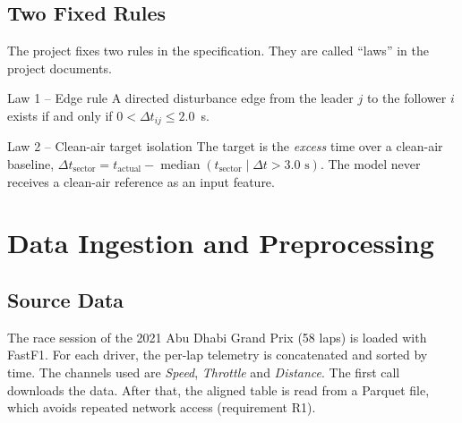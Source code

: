 \documentclass[11pt,a4paper]{article}
\newcommand{\dt}{\Delta t}
\begin{document}
\subsection{Two Fixed Rules}
The project fixes two rules in the specification. They are called ``laws''
in the project documents.
\begin{keybox}{Law 1 -- Edge rule}
A directed disturbance edge from the leader $j$ to the follower $i$ exists if
and only if $0 < \dt_{ij} \le 2.0$~s.
\end{keybox}
\begin{keybox}{Law 2 -- Clean-air target isolation}
The target is the \emph{excess} time over a clean-air baseline,
$\Delta t_{\text{sector}} = t_{\text{actual}} - \operatorname{median}(t_{\text{sector}} \mid \dt > 3.0\text{ s})$.
The model never receives a clean-air reference as an input feature.
\end{keybox}

\section{Data Ingestion and Preprocessing}
\label{sec:data}

\subsection{Source Data}
The race session of the 2021 Abu Dhabi Grand Prix (58 laps) is loaded with
FastF1. For each driver, the per-lap telemetry is concatenated and sorted by
time. The channels used are \emph{Speed}, \emph{Throttle} and
\emph{Distance}. The first call downloads the data. After that, the aligned
table is read from a Parquet file, which avoids repeated network access
(requirement R1).
\end{document}
